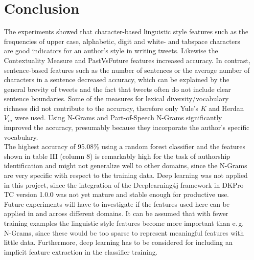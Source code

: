\documentclass[journal, a4paper, 12pt]{IEEEtran}
\begin{document}
\section{Conclusion}
The experiments showed that character-based linguistic style features such as the frequencies of upper case, alphabetic, digit and white- and tabspace characters are good indicators for an author's style in writing tweets. Likewise the Contextuality Measure and PastVsFuture features increased accuracy. In contrast, sentence-based features such as the number of sentences or the average number of characters in a sentence decreased accuracy, which can be explained by the general brevity of tweets and the fact that tweets often do not include clear sentence boundaries. Some of the measures for lexical diversity/vocabulary richness did not contribute to the accuracy, therefore only Yule's $K$ and Herdan $V_m$ were used. Using N-Grams and Part-of-Speech N-Grams significantly improved the accuracy, presumably because they incorporate the author's specific vocabulary.\\
The highest accuracy of 95.08\% using a random forest classifier and the features shown in table III (column 8) is remarkably high for the task of authorship identification and might not generalize well to other domains, since the N-Grams are very specific with respect to the training data. Deep learning was not applied in this project, since the integration of the Deeplearning4j framework in DKPro TC version 1.0.0 was not yet mature and stable enough for productive use.\\
Future experiments will have to investigate if the features used here can be applied in and across different domains. It can be assumed that with fewer training examples the linguistic style features become more important than e.\,g. N-Grams, since these would be too sparse to represent meaningful features with little data. Furthermore, deep learning has to be considered for including an implicit feature extraction in the classifier training.
\end{document}
